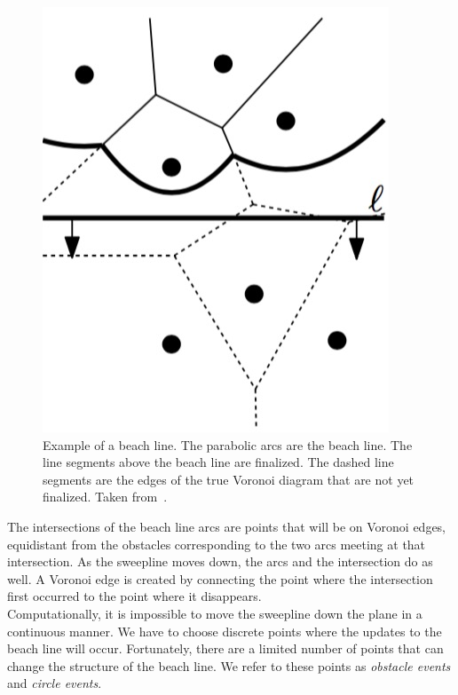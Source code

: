 \documentclass[conference]{IEEEtran}
\begin{document}
\begin{figure}[tp]
    \includegraphics[width=\columnwidth]{beachline}
    \caption{Example of a beach line. The parabolic arcs are the beach line. The line
    segments above the beach line are finalized. The dashed line segments are the
    edges of the true Voronoi diagram that are not yet finalized. Taken
    from~\cite{compgeometry}.}\label{beachline}
\end{figure}

\indent The intersections of the beach line arcs are points that will be on Voronoi
edges, equidistant from the obstacles corresponding to the two arcs meeting at
that intersection. As the sweepline moves down, the arcs and the intersection do
as well. A Voronoi edge is created by connecting the point where the intersection
first occurred to the point where it disappears.\\
\indent Computationally, it is impossible to move the sweepline down the plane in
a continuous manner. We have to choose discrete points where the updates to the
beach line will occur. Fortunately, there are a limited number of points that can
change the structure of the beach line. We refer to these points as \emph{obstacle
events} and \emph{circle events}.
\end{document}
